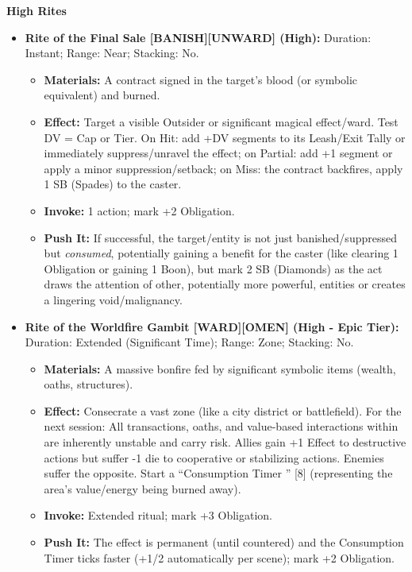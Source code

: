 \documentclass[11pt,letterpaper]{article}
\newcommand{\patronbox}[1]{\noindent\textbf{#1}\\}
\begin{document}
\patronbox{High Rites}
\begin{itemize}[leftmargin=*]
    \item \textbf{Rite of the Final Sale [BANISH][UNWARD] (High):} Duration: Instant; Range: Near; Stacking: No.
    \begin{itemize}
        \item \textbf{Materials:} A contract signed in the target's blood (or symbolic equivalent) and burned.
        \item \textbf{Effect:} Target a visible Outsider or significant magical effect/ward. Test DV = Cap or Tier. On Hit: add +DV segments to its Leash/Exit Tally or immediately suppress/unravel the effect; on Partial: add +1 segment or apply a minor suppression/setback; on Miss: the contract backfires, apply 1 SB (Spades) to the caster.
        \item \textbf{Invoke:} 1 action; mark +2 Obligation.
        \item \textbf{Push It:} If successful, the target/entity is not just banished/suppressed but \textit{consumed}, potentially gaining a benefit for the caster (like clearing 1 Obligation or gaining 1 Boon), but mark 2 SB (Diamonds) as the act draws the attention of other, potentially more powerful, entities or creates a lingering void/malignancy.
    \end{itemize}
    \item \textbf{Rite of the Worldfire Gambit [WARD][OMEN] (High - Epic Tier):} Duration: Extended (Significant Time); Range: Zone; Stacking: No.
    \begin{itemize}
        \item \textbf{Materials:} A massive bonfire fed by significant symbolic items (wealth, oaths, structures).
        \item \textbf{Effect:} Consecrate a vast zone (like a city district or battlefield). For the next session: All transactions, oaths, and value-based interactions within are inherently unstable and carry risk. Allies gain +1 Effect to destructive actions but suffer -1 die to cooperative or stabilizing actions. Enemies suffer the opposite. Start a ``Consumption Timer '' [8] (representing the area's value/energy being burned away).
        \item \textbf{Invoke:} Extended ritual; mark +3 Obligation.
        \item \textbf{Push It:} The effect is permanent (until countered) and the Consumption Timer ticks faster (+1/2 automatically per scene); mark +2 Obligation.
    \end{itemize}
\end{itemize}
\end{document}
